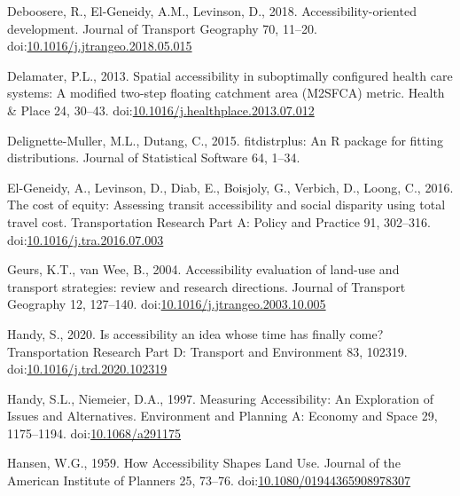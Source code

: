 \documentclass[]{elsarticle} %
\newlength{\cslhangindent}
\newlength{\cslentryspacingunit} %
\newenvironment{CSLReferences}[2] %
 {%
  \setlength{\parindent}{0pt}
  \ifodd #1
  \let\oldpar\par
  \def\par{\hangindent=\cslhangindent\oldpar}
  \fi
  \setlength{\parskip}{#2\cslentryspacingunit}
 }%
 {}
\begin{document}
\begin{CSLReferences}{1}{0}
\leavevmode{}%
Deboosere, R., El-Geneidy, A.M., Levinson, D., 2018.
Accessibility-oriented development. Journal of Transport Geography 70,
11--20.
doi:\href{https://doi.org/10.1016/j.jtrangeo.2018.05.015}{10.1016/j.jtrangeo.2018.05.015}

\leavevmode{}%
Delamater, P.L., 2013. Spatial accessibility in suboptimally configured
health care systems: A modified two-step floating catchment area
(M2SFCA) metric. Health \& Place 24, 30--43.
doi:\href{https://doi.org/10.1016/j.healthplace.2013.07.012}{10.1016/j.healthplace.2013.07.012}

\leavevmode{}%
Delignette-Muller, M.L., Dutang, C., 2015. {fitdistrplus}: An {R}
package for fitting distributions. Journal of Statistical Software 64,
1--34.

\leavevmode{}%
El-Geneidy, A., Levinson, D., Diab, E., Boisjoly, G., Verbich, D.,
Loong, C., 2016. The cost of equity: {Assessing} transit accessibility
and social disparity using total travel cost. Transportation Research
Part A: Policy and Practice 91, 302--316.
doi:\href{https://doi.org/10.1016/j.tra.2016.07.003}{10.1016/j.tra.2016.07.003}

\leavevmode{}%
Geurs, K.T., van Wee, B., 2004. Accessibility evaluation of land-use and
transport strategies: review and research directions. Journal of
Transport Geography 12, 127--140.
doi:\href{https://doi.org/10.1016/j.jtrangeo.2003.10.005}{10.1016/j.jtrangeo.2003.10.005}

\leavevmode{}%
Handy, S., 2020. Is accessibility an idea whose time has finally come?
Transportation Research Part D: Transport and Environment 83, 102319.
doi:\href{https://doi.org/10.1016/j.trd.2020.102319}{10.1016/j.trd.2020.102319}

\leavevmode{}%
Handy, S.L., Niemeier, D.A., 1997. Measuring {Accessibility}: {An}
{Exploration} of {Issues} and {Alternatives}. Environment and Planning
A: Economy and Space 29, 1175--1194.
doi:\href{https://doi.org/10.1068/a291175}{10.1068/a291175}

\leavevmode{}%
Hansen, W.G., 1959. How Accessibility Shapes Land Use. Journal of the
American Institute of Planners 25, 73--76.
doi:\href{https://doi.org/10.1080/01944365908978307}{10.1080/01944365908978307}


\end{CSLReferences}
\end{document}
